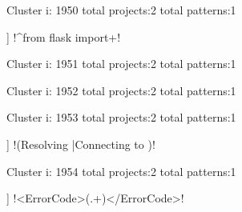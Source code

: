 Cluster i: 1950
total projects:2
total patterns:1
\begin{multicols}{1}
\begin{description}[noitemsep,topsep=0pt]
\item [[2] ] \cverb!^\s*from flask import\s+!
\end{description}
\end{multicols}







Cluster i: 1951
total projects:2
total patterns:1
\begin{multicols}{1}
\end{multicols}







Cluster i: 1952
total projects:2
total patterns:1
\begin{multicols}{1}
\end{multicols}







Cluster i: 1953
total projects:2
total patterns:1
\begin{multicols}{1}
\begin{description}[noitemsep,topsep=0pt]
\item [[2] ] \cverb!(Resolving |Connecting to )!
\end{description}
\end{multicols}







Cluster i: 1954
total projects:2
total patterns:1
\begin{multicols}{1}
\begin{description}[noitemsep,topsep=0pt]
\item [[2] ] \cverb!<ErrorCode>(.+)</ErrorCode>!
\end{description}
\end{multicols}







